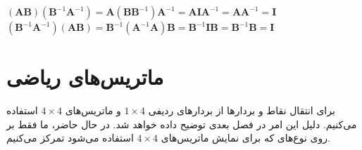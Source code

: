 {\begin{spacing}{1.5}
        \begin{center}
            $(\textbf{AB})(\textbf{B}^{-1}\textbf{A}^{-1})=\textbf{A}(\textbf{B}\textbf{B}^{-1})\textbf{A}^{-1}=\textbf{A}\textbf{I}\textbf{A}^{-1}=\textbf{A}\textbf{A}^{-1}=\textbf{I}$\\
            $(\textbf{B}^{-1}\textbf{A}^{-1})(\textbf{AB})=\textbf{B}^{-1}(\textbf{A}^{-1}\textbf{A})\textbf{B}=\textbf{B}^{-1}\textbf{I}\textbf{B}=\textbf{B}^{-1}\textbf{B}=\textbf{I}$\\
        \end{center}
    \end{spacing}
}


\section{\textbf{ماتریس‌های ریاضی }}
\label{sec:2.8}
{
    \Large
    \begin{spacing}{1.5}
        برای انتقال نقاط و بردارها از بردارهای ردیفی $1\times 4$ و ماتریس‌های $4\times 4$ استفاده می‌کنیم.
        دلیل این امر در فصل بعدی توضیح داده خواهد شد.
        در حال حاضر، ما فقط بر روی نوع‌های  که برای نمایش ماتریس‌های $4\times 4$ استفاده می‌شود تمرکز می‌کنیم.
    \end{spacing}
}

